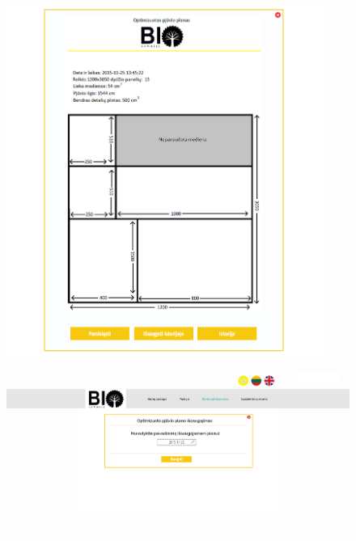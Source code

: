 \documentclass[a4paper,12pt]{article}
\begin{document}
\begin{figure}[!tph]
\hspace{-2cm}
\centering
\includegraphics[scale=1]{interfeisai/optimizavimoPuslapisPrisijungusPasirinktoPerziura2}
\label{fig:horizontalcell}
\end{figure}


\begin{figure}[!tph]
\hspace{-3cm}
\centering
\includegraphics[scale=0.5]{interfeisai/optimizavimoPuslapisPrisijungusPasirinktoPlanoIsaugojimas}
\label{fig:verticalcell}
\end{figure}
\end{document}
